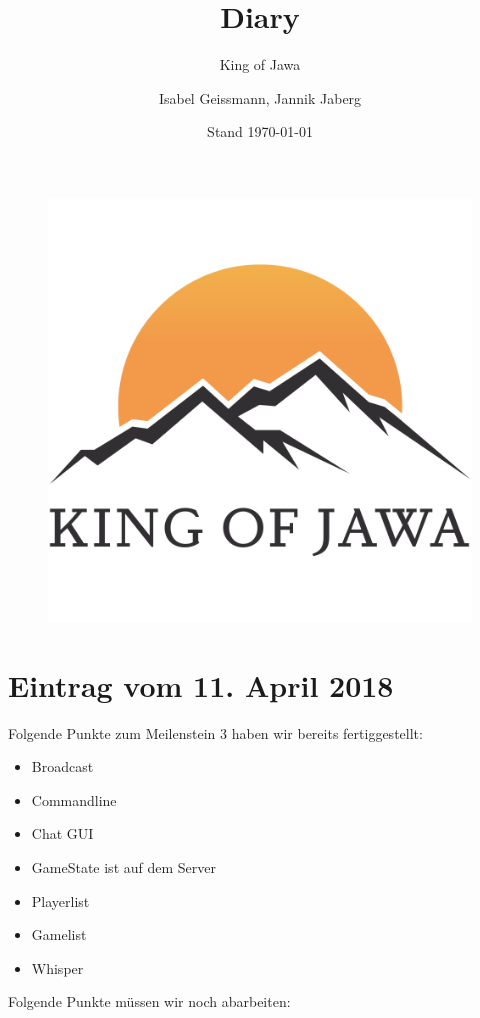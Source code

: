 \documentclass{scrartcl}
\title{Diary}
\subtitle{King of Jawa}
\author{Isabel Geissmann, Jannik Jaberg}
\date{Stand \today}
\newcommand{\n}{\newline}
\begin{document}
\maketitle
\begin{figure}[H]
	\includegraphics[width=\linewidth]{LOGO.png}
\end{figure}


\section*{Eintrag vom 11. April 2018}
Folgende Punkte zum Meilenstein 3 haben wir bereits fertiggestellt:
\begin{itemize}
	\item Broadcast \n
	\item Commandline \n
	\item Chat GUI \n
	\item GameState ist auf dem Server \n
	\item Playerlist \n
	\item Gamelist \n
	\item Whisper \n	
\end{itemize}	
Folgende Punkte müssen wir noch abarbeiten:
\end{document}
